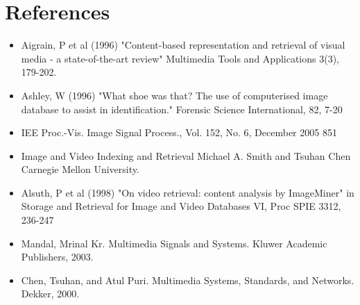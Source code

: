 \chapter{References}
\begin{itemize}
    \item Aigrain, P et al (1996) "Content-based representation and retrieval of visual media - a state-of-the-art review" Multimedia Tools and Applications 3(3), 179-202.
    \item Ashley, W (1996) "What shoe was that? The use of computerised image database to assist in identification." Forensic Science International, 82, 7-20
    \item IEE Proc.-Vis. Image Signal Process., Vol. 152, No. 6, December 2005 851
    \item Image and Video Indexing and Retrieval Michael A. Smith and Tsuhan Chen Carnegie Mellon University.
    \item Alsuth, P et al (1998) "On video retrieval: content analysis by ImageMiner" in Storage and Retrieval for Image and Video Databases VI, Proc SPIE 3312, 236-247
    \item Mandal, Mrinal Kr. Multimedia Signals and Systems. Kluwer Academic Publishers, 2003. 
    \item Chen, Tsuhan, and Atul Puri. Multimedia Systems, Standards, and Networks. Dekker, 2000. 

\end{itemize}